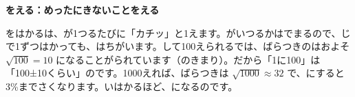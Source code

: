 \begin{butsuri}
\par\addvspace{8pt}\textbf{をえる：めったにきないことをえる}\par
\noindent {}をはかるは、が1つるたびに「カチッ」と1えます。がいつるかはでまるので、じで1ずつはかっても、はちがいます。して100えられるでは、ばらつきのはおよそ $\sqrt{100}=10$ になることがられています（のきまり）。だから「1に100」は「100±10くらい」のです。1000えれば、ばらつきは $\sqrt{1000}\approx32$ で、にすると3\%までさくなります。いはかるほど、になるのです。

\end{butsuri}

